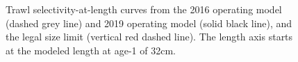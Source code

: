 \documentclass[11pt]{book}
\begin{document}
\newpage
\begin{figure}[htb]

{\centering {} 

}

\caption{Trawl selectivity-at-length curves from the 2016 operating model (dashed grey line) and 2019 operating model (solid black line), and the legal size limit (vertical red dashed line). The length axis starts at the modeled length at age-1 of 32cm.}\label{fig:unnamed-chunk-37}
\end{figure}
\MakeAvailable
\end{document}
